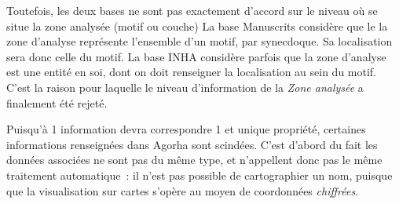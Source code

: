 \documentclass[a4paper,12pt, twoside]{book}
\begin{document}
Toutefois, les deux bases ne sont pas exactement d’accord sur le niveau où se situe la zone analysée (motif ou couche) La base Manuscrits considère que le la zone d’analyse représente l’ensemble d’un motif, par synecdoque. Sa localisation sera donc celle du motif. La base INHA considère parfois que la zone d’analyse est une entité en soi, dont on doit renseigner la localisation au sein du motif. C’est la raison pour laquelle le niveau d’information de la \textit{Zone analysée} a finalement été rejeté.

Puisqu’à 1 information devra correspondre 1 et unique propriété, certaines informations renseignées dans Agorha sont scindées. C’est d’abord du fait les données associées ne sont pas du même type, et n’appellent donc pas le même traitement automatique~: il n’est pas possible de cartographier un nom, puisque que la visualisation sur cartes s’opère au moyen de coordonnées \textit{chiffrées}.
\end{document}
